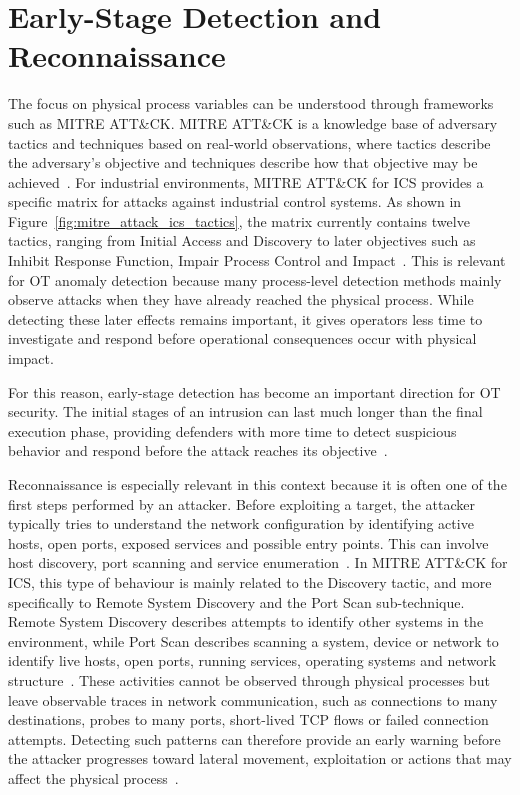 \section{Early-Stage Detection and Reconnaissance}
\label{sec:early_stage_detection}

The focus on physical process variables can be understood through frameworks such as MITRE ATT\&CK. MITRE ATT\&CK is a knowledge base of adversary tactics and techniques based on real-world observations, where tactics describe the adversary's objective and techniques describe how that objective may be achieved~\cite{mitre_attack_2026}. For industrial environments, MITRE ATT\&CK for ICS provides a specific matrix for attacks against industrial control systems. As shown in Figure~\ref{fig:mitre_attack_ics_tactics}, the matrix currently contains twelve tactics, ranging from Initial Access and Discovery to later objectives such as Inhibit Response Function, Impair Process Control and Impact~\cite{mitre_ics_matrix_2026}. This is relevant for OT anomaly detection because many process-level detection methods mainly observe attacks when they have already reached the physical process. While detecting these later effects remains important, it gives operators less time to investigate and respond before operational consequences occur with physical impact.


For this reason, early-stage detection has become an important direction for OT security. The initial stages of an intrusion can last much longer than the final execution phase, providing defenders with more time to detect suspicious behavior and respond before the attack reaches its objective~\cite{behdadnia_early-stage_2025}.


Reconnaissance is especially relevant in this context because it is often one of the first steps performed by an attacker. Before exploiting a target, the attacker typically tries to understand the network configuration by identifying active hosts, open ports, exposed services and possible entry points. This can involve host discovery, port scanning and service enumeration~\cite{keshavamurthy_early_2023,cabana_detecting_2019}. In MITRE ATT\&CK for ICS, this type of behaviour is mainly related to the Discovery tactic, and more specifically to Remote System Discovery and the Port Scan sub-technique. Remote System Discovery describes attempts to identify other systems in the environment, while Port Scan describes scanning a system, device or network to identify live hosts, open ports, running services, operating systems and network structure~\cite{mitre_remote_system_discovery_2026,mitre_port_scan_2026}. These activities cannot be observed through physical processes but leave observable traces in network communication, such as connections to many destinations, probes to many ports, short-lived TCP flows or failed connection attempts. Detecting such patterns can therefore provide an early warning before the attacker progresses toward lateral movement, exploitation or actions that may affect the physical process~\cite{zaidy_comprehensive_2025,ring_detection_2018}.




